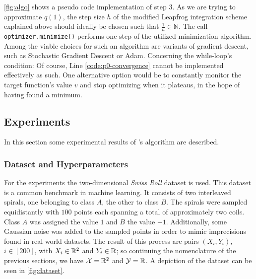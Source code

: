 

\cref{fig:algo} shows a pseudo code implementation of step 3.
As we are trying to approximate $q(1)$, the step size $h$ of the modified Leapfrog integration scheme explained above should ideally be chosen such that $\frac{1}{h} \in \mathbb{N}$.
The call \texttt{optimizer.minimize()} performs one step of the utilized minimization algorithm.
Among the viable choices for such an algorithm are variants of gradient descent, such as Stochastic Gradient Descent or Adam.
Concerning the while-loop's condition: Of course, Line \ref{code:p0-convergence} cannot be implemented effectively as such.
One alternative option would be to constantly monitor the target function's value $v$ and stop optimizing when it plateaus, in the hope of having found a minimum.

\subsection{Experiments}

In this section some experimental results of \citet{owhadi20}'s algorithm are described.

\subsubsection{Dataset and Hyperparameters}

For the experiments the two-dimensional \emph{Swiss Roll} dataset is used.
This dataset is a common benchmark in machine learning.
It consists of two interleaved spirals, one belonging to class $A$, the other to class $B$.
The spirals were sampled equidistantly with $100$ points each spanning a total of approximately two coils.
Class $A$ was assigned the value $1$ and $B$ the value $-1$.
Additionally, some Gaussian noise was added to the sampled points in order to mimic imprecisions found in real world datasets.
The result of this process are pairs $(X_i, Y_i)$, $i \in [200]$, with $X_i \in \mathbb{R}^2$ and $Y_i \in \mathbb{R}$; so continuing the nomenclature of the previous sections, we have $\mathcal{X} = \mathbb{R}^2$ and $\mathcal{Y} = \mathbb{R}$.
A depiction of the dataset can be seen in \cref{fig:dataset}. 



